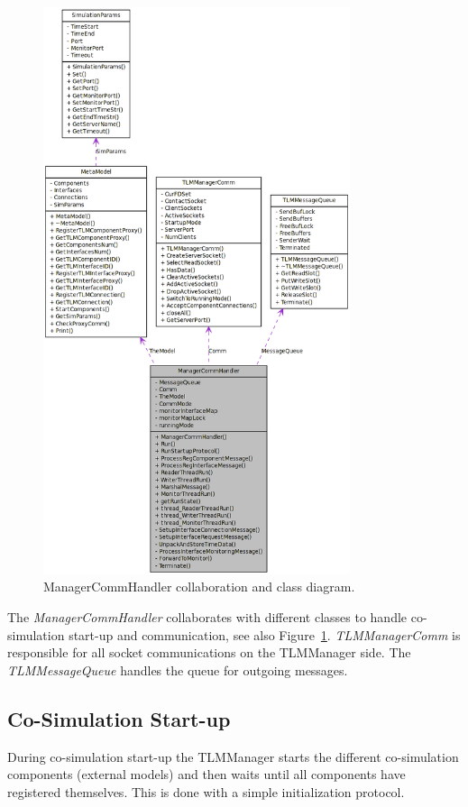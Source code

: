 \begin{figure}
    \begin{center}
    \includegraphics[width=9cm]{figs/classManagerCommHandler__coll__graph.png}
      \caption{ManagerCommHandler collaboration and class diagram.}
      \label{fig:ManagerCommHandlerClassDesign}
    \end{center}
\end{figure}

The {\em ManagerCommHandler} collaborates with different classes to
handle co-simulation start-up and communication, see also
Figure~\ref{fig:ManagerCommHandlerClassDesign}. {\em TLMManagerComm}
is responsible for all socket communications on the TLMManager
side. The {\em TLMMessageQueue} handles the queue for outgoing
messages.

\subsection{Co-Simulation Start-up}
During co-simulation start-up the TLMManager starts the different
co-simulation components (external models) and then waits until all
components have registered themselves. This is done with a simple
initialization protocol.

